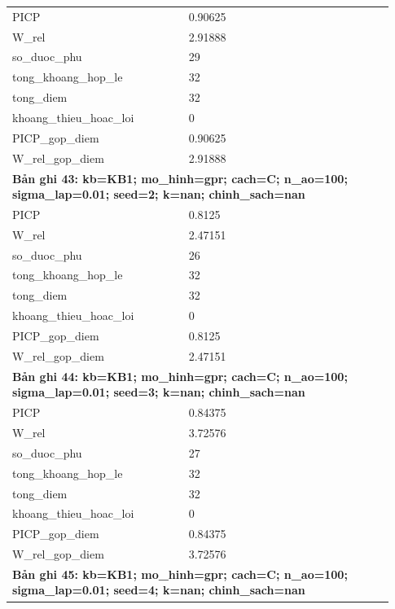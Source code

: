 \begin{longtable}{p{0.43\linewidth}p{0.50\linewidth}}
PICP & 0.90625 \\
W\_\allowbreak rel & 2.91888 \\
so\_\allowbreak duoc\_\allowbreak phu & 29 \\
tong\_\allowbreak khoang\_\allowbreak hop\_\allowbreak le & 32 \\
tong\_\allowbreak diem & 32 \\
khoang\_\allowbreak thieu\_\allowbreak hoac\_\allowbreak loi & 0 \\
PICP\_\allowbreak gop\_\allowbreak diem & 0.90625 \\
W\_\allowbreak rel\_\allowbreak gop\_\allowbreak diem & 2.91888 \\
\midrule
\multicolumn{2}{p{0.95\linewidth}}{\textbf{Bản ghi 43: kb=KB1; mo\_hinh=gpr; cach=C; n\_ao=100; sigma\_lap=0.01; seed=2; k=nan; chinh\_sach=nan}} \\
PICP & 0.8125 \\
W\_\allowbreak rel & 2.47151 \\
so\_\allowbreak duoc\_\allowbreak phu & 26 \\
tong\_\allowbreak khoang\_\allowbreak hop\_\allowbreak le & 32 \\
tong\_\allowbreak diem & 32 \\
khoang\_\allowbreak thieu\_\allowbreak hoac\_\allowbreak loi & 0 \\
PICP\_\allowbreak gop\_\allowbreak diem & 0.8125 \\
W\_\allowbreak rel\_\allowbreak gop\_\allowbreak diem & 2.47151 \\
\midrule
\multicolumn{2}{p{0.95\linewidth}}{\textbf{Bản ghi 44: kb=KB1; mo\_hinh=gpr; cach=C; n\_ao=100; sigma\_lap=0.01; seed=3; k=nan; chinh\_sach=nan}} \\
PICP & 0.84375 \\
W\_\allowbreak rel & 3.72576 \\
so\_\allowbreak duoc\_\allowbreak phu & 27 \\
tong\_\allowbreak khoang\_\allowbreak hop\_\allowbreak le & 32 \\
tong\_\allowbreak diem & 32 \\
khoang\_\allowbreak thieu\_\allowbreak hoac\_\allowbreak loi & 0 \\
PICP\_\allowbreak gop\_\allowbreak diem & 0.84375 \\
W\_\allowbreak rel\_\allowbreak gop\_\allowbreak diem & 3.72576 \\
\midrule
\multicolumn{2}{p{0.95\linewidth}}{\textbf{Bản ghi 45: kb=KB1; mo\_hinh=gpr; cach=C; n\_ao=100; sigma\_lap=0.01; seed=4; k=nan; chinh\_sach=nan}} \\

\end{longtable}
